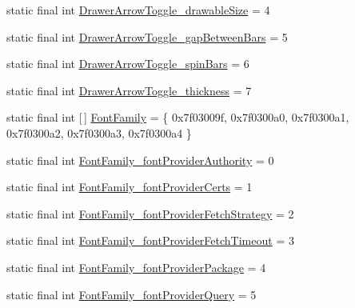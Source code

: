 \begin{DoxyCompactItemize}
\item 
static final int \mbox{\hyperlink{classandroid_1_1support_1_1v7_1_1appcompat_1_1_r_1_1styleable_ab4e5d8c4feff81f48c37f877d680e866}{Drawer\+Arrow\+Toggle\+\_\+drawable\+Size}} = 4
\item 
static final int \mbox{\hyperlink{classandroid_1_1support_1_1v7_1_1appcompat_1_1_r_1_1styleable_a6e43ac7ba6e98e7802537044437c6806}{Drawer\+Arrow\+Toggle\+\_\+gap\+Between\+Bars}} = 5
\item 
static final int \mbox{\hyperlink{classandroid_1_1support_1_1v7_1_1appcompat_1_1_r_1_1styleable_a93a75bb35b9128705ac454ab5390f384}{Drawer\+Arrow\+Toggle\+\_\+spin\+Bars}} = 6
\item 
static final int \mbox{\hyperlink{classandroid_1_1support_1_1v7_1_1appcompat_1_1_r_1_1styleable_a4c29e2305386cfb011ab7da889aeae29}{Drawer\+Arrow\+Toggle\+\_\+thickness}} = 7
\item 
static final int \mbox{[}$\,$\mbox{]} \mbox{\hyperlink{classandroid_1_1support_1_1v7_1_1appcompat_1_1_r_1_1styleable_a6de611067e40bc66c1948fd0cf299028}{Font\+Family}} = \{ 0x7f03009f, 0x7f0300a0, 0x7f0300a1, 0x7f0300a2, 0x7f0300a3, 0x7f0300a4 \}
\item 
static final int \mbox{\hyperlink{classandroid_1_1support_1_1v7_1_1appcompat_1_1_r_1_1styleable_a2551421beec3a2a901708473ad82f5d5}{Font\+Family\+\_\+font\+Provider\+Authority}} = 0
\item 
static final int \mbox{\hyperlink{classandroid_1_1support_1_1v7_1_1appcompat_1_1_r_1_1styleable_a019726e636a88a71481fe7449242b56d}{Font\+Family\+\_\+font\+Provider\+Certs}} = 1
\item 
static final int \mbox{\hyperlink{classandroid_1_1support_1_1v7_1_1appcompat_1_1_r_1_1styleable_ad76e6435a886393de355c01073f08bb5}{Font\+Family\+\_\+font\+Provider\+Fetch\+Strategy}} = 2
\item 
static final int \mbox{\hyperlink{classandroid_1_1support_1_1v7_1_1appcompat_1_1_r_1_1styleable_ab4af48164430583c13f7385941854c70}{Font\+Family\+\_\+font\+Provider\+Fetch\+Timeout}} = 3
\item 
static final int \mbox{\hyperlink{classandroid_1_1support_1_1v7_1_1appcompat_1_1_r_1_1styleable_aa71250d89aba0fe33311fd2628342aad}{Font\+Family\+\_\+font\+Provider\+Package}} = 4
\item 
static final int \mbox{\hyperlink{classandroid_1_1support_1_1v7_1_1appcompat_1_1_r_1_1styleable_abe35be4821e4580533c65cfc02749d61}{Font\+Family\+\_\+font\+Provider\+Query}} = 5
\item 

\end{DoxyCompactItemize}
